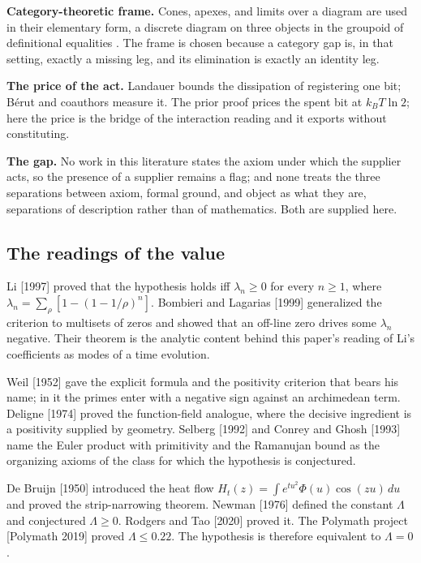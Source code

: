 \documentclass[10pt,twocolumn]{article}
\begin{document}
\textbf{Category-theoretic frame.} Cones, apexes, and limits over a
diagram are used in their elementary form, a discrete diagram on three
objects in the groupoid of definitional equalities \cite{maclane1998}.
The frame is chosen because a category gap is, in that setting, exactly
a missing leg, and its elimination is exactly an identity leg.

\textbf{The price of the act.} Landauer \cite{landauer1961} bounds the
dissipation of registering one bit; Bérut and coauthors \cite{berut2012}
measure it. The prior proof prices the spent bit at \(k_B T \ln 2\);
here the price is the bridge of the interaction reading and it exports
without constituting.

\textbf{The gap.} No work in this literature states the axiom under
which the supplier acts, so the presence of a supplier remains a flag;
and none treats the three separations between axiom, formal ground, and
object as what they are, separations of description rather than of
mathematics. Both are supplied here.

\hypertarget{the-readings-of-the-value}{%
\subsection{The readings of the value}\label{the-readings-of-the-value}}

Li {[}1997{]} proved that the hypothesis holds iff \(\lambda_n \geq 0\)
for every \(n \geq 1\), where
\(\lambda_n = \sum_\rho [1 - (1 - 1/\rho)^n]\). Bombieri and Lagarias
{[}1999{]} generalized the criterion to multisets of zeros and showed
that an off-line zero drives some \(\lambda_n\) negative. Their theorem
is the analytic content behind this paper's reading of Li's coefficients
as modes of a time evolution.

Weil {[}1952{]} gave the explicit formula and the positivity criterion
that bears his name; in it the primes enter with a negative sign against
an archimedean term. Deligne {[}1974{]} proved the function-field
analogue, where the decisive ingredient is a positivity supplied by
geometry. Selberg {[}1992{]} and Conrey and Ghosh {[}1993{]} name the
Euler product with primitivity and the Ramanujan bound as the organizing
axioms of the class for which the hypothesis is conjectured.

De Bruijn {[}1950{]} introduced the heat flow
\(H_t(z) = \int e^{tu^2} \Phi(u) \cos(zu)\, du\) and proved the
strip-narrowing theorem. Newman {[}1976{]} defined the constant
\(\Lambda\) and conjectured \(\Lambda \geq 0\). Rodgers and Tao
{[}2020{]} proved it. The Polymath project {[}Polymath 2019{]} proved
\(\Lambda \leq 0.22\). The hypothesis is therefore equivalent to
\(\Lambda = 0\).
\end{document}
